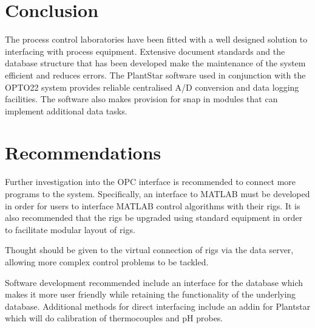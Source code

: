 \section{Conclusion}
The process control laboratories have been fitted with a well designed solution to interfacing with process equipment.  Extensive document standards and the database structure that has been developed make the maintenance of the system efficient and reduces errors.  The PlantStar software used in conjunction with the OPTO22 system provides reliable centralised A/D conversion and data logging facilities.  The software also makes provision for snap in modules that can implement additional data tasks.

\section{Recommendations}
Further investigation into the OPC interface is recommended to connect more programs to the system.  Specifically, an interface to MATLAB must be developed in order for users to interface MATLAB control algorithms with their rigs.  It is also recommended that the rigs be upgraded using standard equipment in order to facilitate modular layout of rigs.

Thought should be given to the virtual connection of rigs via the data server, allowing more complex control problems to be tackled.

Software development recommended include an interface for the database which makes it more user friendly while retaining the functionality of the underlying database.  Additional methods for direct interfacing include an addin for Plantstar which will do calibration of thermocouples and pH probes.
